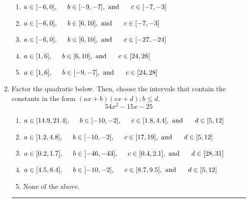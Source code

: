 \documentclass[14pt]{extbook}
\newcommand{\litem}[1]{\item#1\hspace*{-1cm}\rule{\textwidth}{0.4pt}}
\begin{document}
\begin{enumerate}
{\begin{center}
\end{center}
\begin{enumerate}[label=\Alph*.]
\item \( a \in [-6, 0], \hspace*{5mm} b \in [-9, -7], \text{ and } \hspace*{5mm} c \in [-7, -3] \)
\item \( a \in [-6, 0], \hspace*{5mm} b \in [6, 10], \text{ and } \hspace*{5mm} c \in [-7, -3] \)
\item \( a \in [-6, 0], \hspace*{5mm} b \in [6, 10], \text{ and } \hspace*{5mm} c \in [-27, -24] \)
\item \( a \in [1, 6], \hspace*{5mm} b \in [6, 10], \text{ and } \hspace*{5mm} c \in [24, 28] \)
\item \( a \in [1, 6], \hspace*{5mm} b \in [-9, -7], \text{ and } \hspace*{5mm} c \in [24, 28] \)

\end{enumerate} }
\litem{
Factor the quadratic below. Then, choose the intervals that contain the constants in the form $(ax+b)(cx+d); b \leq d.$\[ 54x^{2} -15 x -25 \]\begin{enumerate}[label=\Alph*.]
\item \( a \in [14.9, 21.4], \hspace*{5mm} b \in [-10, -2], \hspace*{5mm} c \in [1.8, 4.4], \text{ and } \hspace*{5mm} d \in [5, 12] \)
\item \( a \in [1.2, 4.8], \hspace*{5mm} b \in [-10, -2], \hspace*{5mm} c \in [17, 19], \text{ and } \hspace*{5mm} d \in [5, 12] \)
\item \( a \in [0.2, 1.7], \hspace*{5mm} b \in [-46, -43], \hspace*{5mm} c \in [0.4, 2.1], \text{ and } \hspace*{5mm} d \in [28, 31] \)
\item \( a \in [4.5, 8.4], \hspace*{5mm} b \in [-10, -2], \hspace*{5mm} c \in [8.7, 9.5], \text{ and } \hspace*{5mm} d \in [5, 12] \)
\item \( \text{None of the above.} \)


\end{enumerate}}
\end{enumerate}
\end{document}
